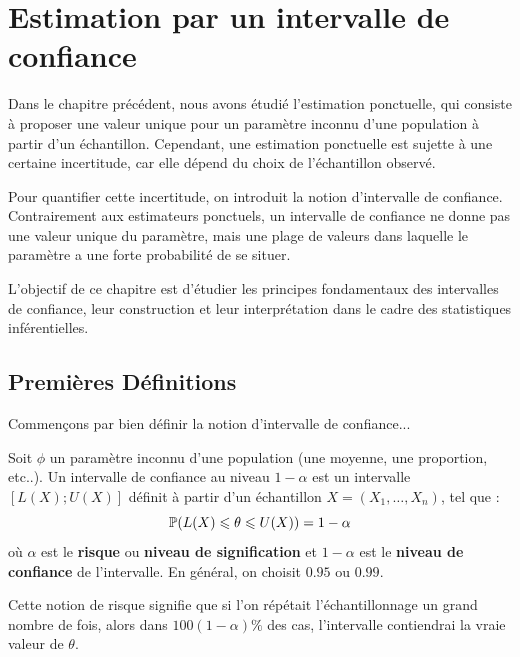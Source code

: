 \chapter{Estimation par un intervalle de confiance}


Dans le chapitre précédent, nous avons étudié l'estimation ponctuelle, qui consiste à proposer une 
valeur unique pour un paramètre inconnu d'une population à partir d’un échantillon. 
Cependant, une estimation ponctuelle est sujette à une certaine incertitude, car elle dépend du 
choix de l’échantillon observé.

Pour quantifier cette incertitude, on introduit la notion d’intervalle de confiance. 
Contrairement aux estimateurs ponctuels, un intervalle de confiance ne donne pas une valeur unique 
du paramètre, mais une plage de valeurs dans laquelle le paramètre a une forte probabilité de se situer.

L’objectif de ce chapitre est d’étudier les principes fondamentaux des intervalles de confiance, 
leur construction et leur interprétation dans le cadre des statistiques inférentielles.



\section{Premières Définitions}


Commençons par bien définir la notion d'intervalle de confiance... 

\begin{definition}
    Soit $\phi$ un paramètre inconnu d'une population (une moyenne, une proportion, etc..). 
    Un intervalle de confiance au niveau $1 - \alpha$ est un intervalle $[ L(X); U(X)]$ définit 
    à partir d'un échantillon $X = (X_1, \dots, X_n)$, tel que :
        \[ \mathbb{P}(L(X) \leqslant \theta \leqslant U(X)) = 1 - \alpha \] 
    où $\alpha$ est le \textbf{risque} ou \textbf{niveau de signification} et $1-\alpha$ 
    est le \textbf{niveau de confiance} de l'intervalle. En général, on choisit $0.95$ ou $0.99$. 
\end{definition}

Cette notion de risque signifie que si l'on répétait l'échantillonnage un grand nombre de fois, 
alors dans $100(1 - \alpha) \%$ des cas, l'intervalle contiendrai la vraie valeur de $\theta$. 

